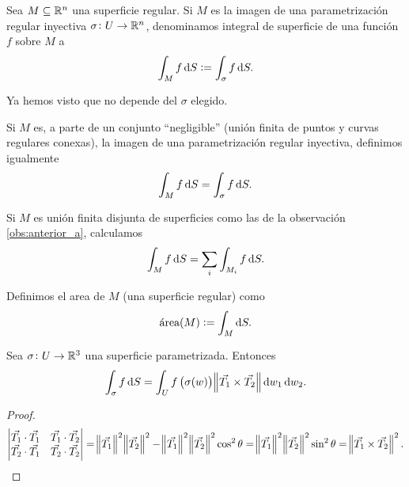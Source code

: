 \begin{defi}
    Sea $M \subseteq \mathbb{R}^n$ una superficie regular. Si $M$ es la imagen de una parametrización regular inyectiva $\sigma \colon U \to \mathbb{R}^n$,
    denominamos integral de superficie de una función $f$ sobre $M$ a
    \[
        \int_M f \dif S := \int_\sigma f \dif S.
    \]
\end{defi}

\begin{obs*}
    Ya hemos visto que no depende del $\sigma$ elegido.
\end{obs*}

\begin{obs}\label{obs:anterior_a}
    Si $M$ es, a parte de un conjunto ``negligible'' (unión finita de puntos y curvas regulares conexas), la imagen de una parametrización regular inyectiva,
    definimos igualmente
    \[
        \int_M f \dif S = \int_\sigma f \dif S.
    \]
\end{obs}

\begin{obs*}
    Si $M$ es unión finita disjunta de superficies como las de la observación \ref{obs:anterior_a}, calculamos
    \[
        \int_M f \dif S = \sum_i \int_{M_i} f \dif S.
    \]
\end{obs*}

\begin{defi}
    Definimos el area de $M$ (una superficie regular) como
    \[
        \text{\'area}(M) := \int_M \dif S.
    \]
\end{defi}

\begin{lema}
    Sea $\sigma \colon U \to \mathbb{R}^3$ una superficie parametrizada. Entonces
    \[
        \int_\sigma f \dif S = \int_U f\left( \sigma(w) \right) \norm{\vec{T_1} \times \vec{T_2}} \dif w_1 \dif w_2.
    \]
\end{lema}

\begin{proof}
    \[
        \begin{vmatrix}\vec{T_1}\cdot \vec{T_1} & \vec{T_1} \cdot \vec{T_2} \\ \vec{T_2}\cdot\vec{T_1} & \vec{T_2}\cdot\vec{T_2}\end{vmatrix} =
        \norm{\vec{T_1}}^2 \norm{\vec{T_2}}^2 - \norm{\vec{T_1}}^2\norm{\vec{T_2}}^2 \cos^2 \theta = \norm{\vec{T_1}}^2\norm{\vec{T_2}}^2 \sin^2 \theta
        = \norm{\vec{T_1} \times \vec{T_2}}^2.
    \]
\end{proof}


